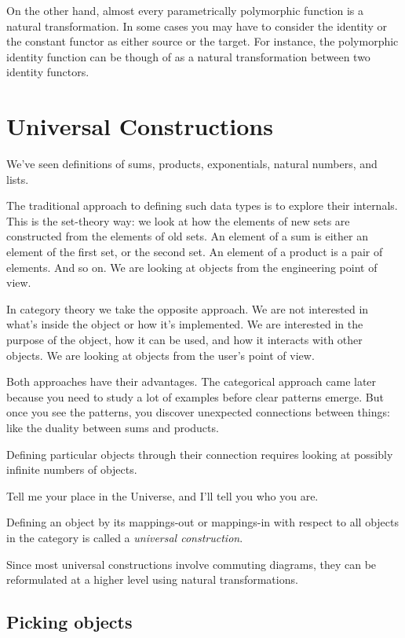 \documentclass[DaoFP]{subfiles}
\begin{document}
On the other hand, almost every parametrically polymorphic function is a natural transformation. In some cases you may have to consider the identity or the constant functor as either source or the target. For instance, the polymorphic identity function can be though of as a natural transformation between two identity functors.

\section{Universal Constructions}

We've seen definitions of sums, products, exponentials, natural numbers, and lists. 

The traditional approach to defining such data types is to explore their internals. This is the set-theory way: we look at how the elements of new sets are constructed from the elements of old sets. An element of a sum is either an element of the first set, or the second set. An element of a product is a pair of elements. And so on. We are looking at objects from the engineering point of view.

In category theory we take the opposite approach. We are not interested in what's inside the object or how it's implemented. We are interested in the purpose of the object, how it can be used, and how it interacts with other objects. We are looking at objects from the user's point of view.

Both approaches have their advantages. The categorical approach came later because you need to study a lot of examples before clear patterns emerge. But once you see the patterns, you discover unexpected connections between things: like the duality between sums and products.

Defining particular objects through their connection requires looking at possibly infinite numbers of objects. 

Tell me your place in the Universe, and I'll tell you who you are.

Defining an object by its mappings-out or mappings-in with respect to all objects in the category is called a \emph{universal construction}. 

Since most universal constructions involve commuting diagrams, they can be reformulated at a higher level using natural transformations.

\subsection{Picking objects}
\end{document}

